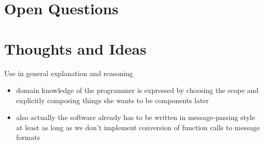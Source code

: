 \documentclass{scrartcl}
\begin{document}
\section{Open Questions}
\section{Thoughts and Ideas}
Use in general explanation and reasoning
\begin{itemize}
    \item domain knowledge of the programmer is expressed by choosing the scope and explicitly composing things she wants to be components later
    \item also actually the software already has to be written in message-passing style at least as long as we don't implement conversion of function calls to message formats
    
\end{itemize}
\end{document}
